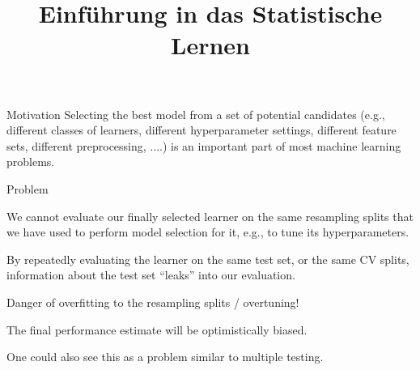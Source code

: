 \documentclass[11pt,compress,t,notes=noshow, xcolor=table]{beamer}
\title{Einführung in das Statistische Lernen}
\institute{\href{https://compstat-lmu.github.io/lecture_i2ml/}{compstat-lmu.github.io/lecture\_i2ml}}
\date{}
\begin{document}











\begin{vbframe}{Motivation}
Selecting the best model from a set of potential candidates (e.g., different classes of learners, different hyperparameter settings, different feature sets, different preprocessing, ....) is an important part of most  machine learning problems.
\vspace{-1ex}
\begin{blocki}{Problem}
    \item We cannot evaluate our finally selected learner on the same resampling splits that we have used to perform model selection for it, e.g., to tune its hyperparameters.
    \item By repeatedly evaluating the learner on the same test set, or the same CV splits, information
      about the test set \enquote{leaks} into our evaluation.
    \item Danger of overfitting to the resampling splits / overtuning!
    \item The final performance estimate will be optimistically biased.
    \item One could also see this as a problem similar to multiple testing.
\end{blocki}
\end{vbframe}
\end{document}
